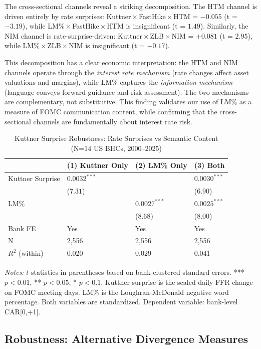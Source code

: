 \documentclass[12pt,a4paper]{article}
\begin{document}
The cross-sectional channels reveal a striking decomposition. The HTM channel is driven entirely by rate surprises: Kuttner\,$\times$\,FastHike\,$\times$\,HTM = $-0.055$ (t = $-3.19$), while LM\%\,$\times$\,FastHike\,$\times$\,HTM is insignificant (t = $1.49$). Similarly, the NIM channel is rate-surprise-driven: Kuttner\,$\times$\,ZLB\,$\times$\,NIM = $+0.081$ (t = $2.95$), while LM\%\,$\times$\,ZLB\,$\times$\,NIM is insignificant (t = $-0.17$).

This decomposition has a clear economic interpretation: the HTM and NIM channels operate through the \textit{interest rate mechanism} (rate changes affect asset valuations and margins), while LM\% captures the \textit{information mechanism} (language conveys forward guidance and risk assessment). The two mechanisms are complementary, not substitutive. This finding validates our use of LM\% as a measure of FOMC communication content, while confirming that the cross-sectional channels are fundamentally about interest rate risk.

\begin{table}[H]
\centering
\caption{Kuttner Surprise Robustness: Rate Surprises vs Semantic Content (N=14 US BHCs, 2000--2025)}
\label{tab:kuttner}
\small
\begin{tabular}{llll}
\toprule
 & (1) Kuttner Only & (2) LM\% Only & (3) Both \\
\midrule
Kuttner Surprise & $0.0032^{***}$ &  & $0.0030^{***}$ \\
 & ($7.31$) &  & ($6.90$) \\
LM\% &  & $0.0027^{***}$ & $0.0025^{***}$ \\
 &  & ($8.68$) & ($8.00$) \\
\midrule
Bank FE & Yes & Yes & Yes \\
N & 2,556 & 2,556 & 2,556 \\
$R^2$ (within) & 0.020 & 0.029 & 0.041 \\
\bottomrule
\end{tabular}
\end{table}
\noindent\textit{Notes:} $t$-statistics in parentheses based on bank-clustered standard errors. *** $p<0.01$, ** $p<0.05$, * $p<0.1$. Kuttner surprise is the scaled daily FFR change on FOMC meeting days. LM\% is the Loughran-McDonald negative word percentage. Both variables are standardized. Dependent variable: bank-level CAR[0,+1].

\subsection{Robustness: Alternative Divergence Measures}
\end{document}
